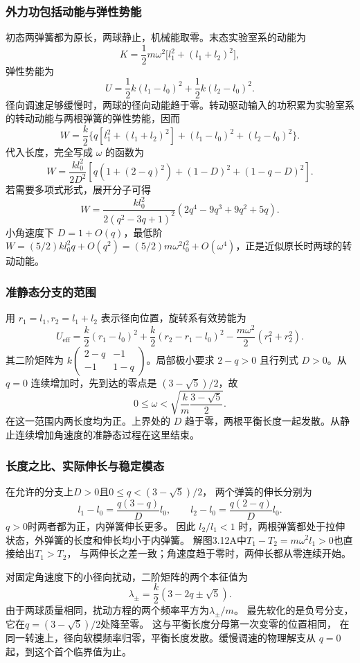 \documentclass[UTF8,fontset=fandol,a4paper,11pt]{ctexart}
\begin{document}
\subsubsection*{外力功包括动能与弹性势能}
初态两弹簧都为原长，两球静止，机械能取零。末态实验室系的动能为
\[
K=\frac12m\omega^2\bigl[l_1^2+(l_1+l_2)^2\bigr],
\]
弹性势能为
\[
U=\frac12k(l_1-l_0)^2+\frac12k(l_2-l_0)^2.
\]
径向调速足够缓慢时，两球的径向动能趋于零。转动驱动输入的功积累为实验室系的转动动能与两根弹簧的弹性势能，因而
\[
W=\frac{k}{2}\{q[l_1^2+(l_1+l_2)^2]
+(l_1-l_0)^2+(l_2-l_0)^2\}.
\]
代入长度，完全写成 $\omega$ 的函数为
\[
\boxed{W=\frac{kl_0^2}{2D^2}
\left[q(1+(2-q)^2)+(1-D)^2+(1-q-D)^2\right]}.
\]
若需要多项式形式，展开分子可得
\[
W=\frac{kl_0^2}{2(q^2-3q+1)^2}
\left(2q^4-9q^3+9q^2+5q\right).
\]
小角速度下 $D=1+O(q)$，最低阶 $W=(5/2)kl_0^2q+O(q^2)
=(5/2)m\omega^2l_0^2+O(\omega^4)$，正是近似原长时两球的转动动能。

\subsubsection*{准静态分支的范围}
用 $r_1=l_1,r_2=l_1+l_2$ 表示径向位置，旋转系有效势能为
\[
U_{\mathrm{eff}}=\frac{k}{2}(r_1-l_0)^2
+\frac{k}{2}(r_2-r_1-l_0)^2
-\frac{m\omega^2}{2}(r_1^2+r_2^2).
\]
其二阶矩阵为 $k\begin{pmatrix}2-q&-1\\-1&1-q\end{pmatrix}$。局部极小要求 $2-q>0$ 且行列式 $D>0$。从 $q=0$ 连续增加时，先到达的零点是 $(3-\sqrt5)/2$，故
\[
\boxed{0\leq\omega<
\sqrt{\frac{k}{m}\frac{3-\sqrt5}{2}}}.
\]
在这一范围内两长度均为正。上界处的 $D$ 趋于零，两根平衡长度一起发散。从静止连续增加角速度的准静态过程在这里结束。
\subsubsection*{长度之比、实际伸长与稳定模态}
在允许的分支上$D>0$且$0\leq q<(3-\sqrt5)/2$，
两个弹簧的伸长分别为
\[
l_1-l_0=\frac{q(3-q)}D l_0,
\qquad l_2-l_0=\frac{q(2-q)}D l_0.
\]
$q>0$时两者都为正，内弹簧伸长更多。
因此 $l_2/l_1<1$ 时，两根弹簧都处于拉伸状态，外弹簧的长度和伸长均小于内弹簧。
解图3.12A中$T_1-T_2=m\omega^2l_1>0$也直接给出$T_1>T_2$，
与两伸长之差一致；角速度趋于零时，两伸长都从零连续开始。

对固定角速度下的小径向扰动，二阶矩阵的两个本征值为
\[
\lambda_\pm=\frac k2(3-2q\pm\sqrt5).
\]
由于两球质量相同，扰动方程的两个频率平方为$\lambda_\pm/m$。
最先软化的是负号分支，它在$q=(3-\sqrt5)/2$处降至零。
这与平衡长度分母第一次变零的位置相同，
在同一转速上，径向软模频率归零，平衡长度发散。缓慢调速的物理解支从 $q=0$ 起，到这个首个临界值为止。
\end{document}
